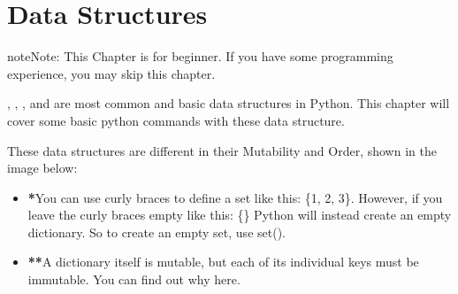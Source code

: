 \documentclass[letterpaper,12pt,english]{sphinxmanual}
\begin{document}
\sphinxAtStartPar
{}

\begin{sphinxVerbatim}[commandchars=\\\{\}]

\end{sphinxVerbatim}

\sphinxAtStartPar
{}

\begin{sphinxVerbatim}[commandchars=\\\{\}]

\end{sphinxVerbatim}

\sphinxAtStartPar
{}

\begin{sphinxVerbatim}[commandchars=\\\{\}]

\end{sphinxVerbatim}


\chapter{Data Structures}
\label{\detokenize{struct:data-structures}}\label{\detokenize{struct:struct}}\label{\detokenize{struct::doc}}
\begin{sphinxadmonition}{note}{Note:}
\sphinxAtStartPar
This Chapter {\hyperref[\detokenize{struct:struct}]{}} is for beginner.  If you have some  programming experience, you may skip this chapter.
\end{sphinxadmonition}

\sphinxAtStartPar
{}, , , and  are most common and basic data structures in Python.
This chapter will cover some basic python commands with these data structure.

\sphinxAtStartPar
These data structures are different in their Mutability and Order, shown in the image below:
\begin{quote}

\begin{figure}[htbp]
\centering

\noindent{}
\end{figure}
\end{quote}
\begin{itemize}
\item {} 
\sphinxAtStartPar
{\color{red}\bfseries{}*}You can use curly braces to define a set like this: \{1, 2, 3\}. However, if you leave the curly braces empty like this: \{\} Python will instead create an empty dictionary. So to create an empty set, use set().

\item {} 
\sphinxAtStartPar
{\color{red}\bfseries{}**}A dictionary itself is mutable, but each of its individual keys must be immutable. You can find out why here.

\end{itemize}
\end{document}
